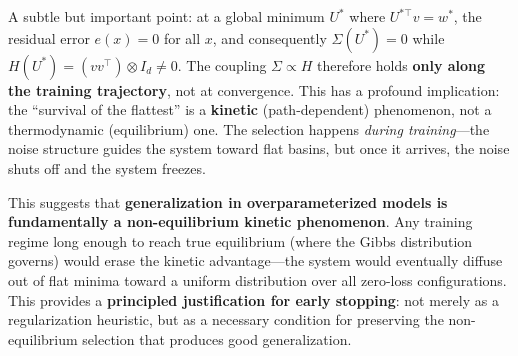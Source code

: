 \documentclass[
  journal=largetwo,
  simfonts=false,
  year=2025,
  volume=37,
]{cup-journal}
\begin{document}
\begin{remark}\label{rmk:coupling_vanishes}
A subtle but important point: at a global minimum $U^*$ where $U^{*\top}v = w^*$, the residual error $e(x) = 0$ for all $x$, and consequently $\Sigma(U^*) = 0$ while $H(U^*) = (vv^\top)\otimes I_d \neq 0$. The coupling $\Sigma \propto H$ therefore holds \textbf{only along the training trajectory}, not at convergence. This has a profound implication: the ``survival of the flattest'' is a \textbf{kinetic} (path-dependent) phenomenon, not a thermodynamic (equilibrium) one. The selection happens \textit{during training}---the noise structure guides the system toward flat basins, but once it arrives, the noise shuts off and the system freezes.

This suggests that \textbf{generalization in overparameterized models is fundamentally a non-equilibrium kinetic phenomenon}. Any training regime long enough to reach true equilibrium (where the Gibbs distribution governs) would erase the kinetic advantage---the system would eventually diffuse out of flat minima toward a uniform distribution over all zero-loss configurations. This provides a \textbf{principled justification for early stopping}: not merely as a regularization heuristic, but as a necessary condition for preserving the non-equilibrium selection that produces good generalization.
\end{remark}
\end{document}
